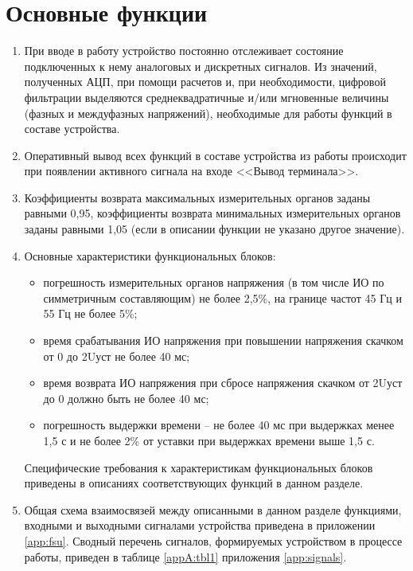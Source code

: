 \color{uniblue}\section[Основные функции]{Основные функции}\label{sec:funcs}
\color{black}

\color{black}

\begin{enumerate}
    
\item
При вводе в работу устройство постоянно отслеживает состояние подключенных к нему аналоговых и дискретных сигналов. Из значений, полученных АЦП, при помощи расчетов и, при необходимости, цифровой фильтрации выделяются среднеквадратичные и/или мгновенные величины (фазных и междуфазных напряжений), необходимые для работы функций в составе устройства.
\item
Оперативный вывод всех функций в составе устройства из работы происходит при появлении активного сигнала на входе <<Вывод терминала>>.
\item
Коэффициенты возврата максимальных измерительных органов заданы равными 0,95, коэффициенты возврата минимальных измерительных органов заданы равными 1,05 (если в описании функции не указано другое значение).
\item
Основные характеристики функциональных блоков:
\begin{itemize}
    \item погрешность измерительных органов напряжения (в том числе ИО по симметричным составляющим) не более 2,5\%, на границе частот 45 Гц и 55 Гц не более 5\%;
    \item время срабатывания ИО напряжения при повышении напряжения скачком от 0 до 2Uуст не более 40 мс;
    \item время возврата ИО напряжения при сбросе напряжения скачком от 2Uуст до 0 должно быть не более 40 мс; 
    \item погрешность выдержки времени -- не более 40 мс при выдержках менее 1,5 с и не более 2\% от уставки при выдержках времени выше 1,5 с.
\end{itemize}
Специфические требования к характеристикам функциональных блоков приведены в описаниях соответствующих функций в данном разделе. 
\item
Общая схема взаимосвязей между описанными в данном разделе функциями, входными и выходными сигналами устройства приведена в приложении \ref{app:fsu}.
Сводный перечень сигналов, формируемых устройством в процессе работы, приведен в таблице \ref{appA:tbl1} приложения \ref{app:signals}.

\end{enumerate}
